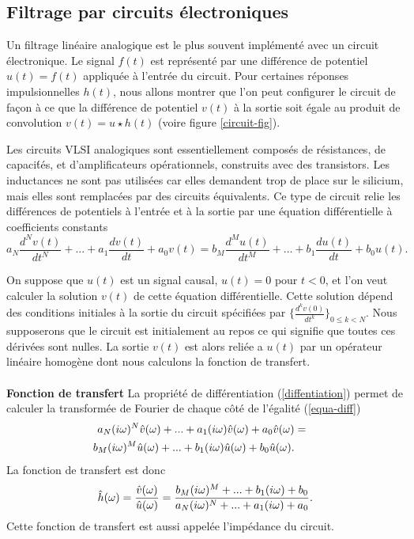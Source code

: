 \subsection{Filtrage par circuits \'electroniques}
\label{circuits}

Un filtrage lin\'eaire analogique est le plus
souvent impl\'ement\'e avec un
circuit \'electronique. Le signal $f(t)$ est
repr\'esent\'e par une diff\'erence de potentiel $u (t) = f(t)$
appliqu\'ee \`a l'entr\'ee du circuit. 
Pour certaines r\'eponses impulsionnelles $h(t)$, nous allons montrer
que l'on peut configurer le circuit de fa\c con \`a ce que
la diff\'erence de potentiel
$v (t)$ \`a la sortie soit \'egale au produit de convolution
$v (t) = u \star h (t)$ (voire figure \ref{circuit-fig}).

Les circuits VLSI analogiques sont 
essentiellement compos\'es de r\'esistances, de capaci\'t\'es, et
d'amplificateurs op\'erationnels, construits avec  
des transistors. Les inductances ne sont pas utilis\'ees 
car elles demandent trop de place sur le silicium,
mais elles sont remplac\'ees par 
des circuits \'equivalents.
Ce type de circuit relie les diff\'erences de
potentiels \`a l'entr\'ee et \`a la sortie par une \'equation 
diff\'erentielle
\`a coefficients constants
\begin{equation}
\label{equa-diff}
a_N \frac {d^N v (t)}{dt^N} + 
... + a_{1} \frac {d v (t)}{dt} + a_0 v (t) = 
b_M \frac {d^M u (t)}{dt^M} + 
... + b_{1} \frac {d u (t)}{dt} + b_0 u (t) .
\end{equation}

On suppose que $u (t)$ est un signal causal, $u (t) = 0$ pour
$t < 0$, et l'on veut calculer la solution $v (t)$ de 
cette \'equation diff\'erentielle. 
Cette solution d\'epend des conditions initiales
\`a la sortie du circuit sp\'ecifi\'ees par 
$ \{ \frac {d^k v (0)} {dt^k} \}_{0 \leq k < N}$.
Nous supposerons que le circuit est initialement au repos ce qui
signifie que toutes ces d\'eriv\'ees sont nulles. 
La sortie $v(t)$ est alors reli\'ee a $u(t)$ par un op\'erateur
lin\'eaire homog\`ene dont nous calculons la fonction de transfert.
\\
\\
{\bf Fonction de transfert}
La propri\'et\'e de diff\'erentiation 
(\ref{diffentiation}) permet de calculer
la transform\'ee de Fourier de chaque c\^ot\'e de 
l'\'egalit\'e (\ref{equa-diff})
\begin{eqnarray*}
{a_N (i{\omega})^N \hat v ({\omega}) + ... + a_{1} (i {\omega}) \hat v ({\omega}) 
+ a_0} \hat v ({\omega}) & = &\\
{b_M (i{\omega})^M \hat u ({\omega}) + ... + b_{1} (i {\omega}) \hat u ({\omega})
+ b_0} \hat u ({\omega}). & &
\end{eqnarray*}
La fonction de transfert est donc
\begin{equation}
\label{electr-transf}
\hat h ({\omega}) = \frac {\hat v ({\omega})}{\hat u ({\omega})} =
\frac {b_M (i{\omega})^M + ... + b_{1} (i {\omega}) + b_0} 
{a_N (i{\omega})^N + ... + a_{1} (i {\omega}) + a_0} .
\end{equation}
Cette fonction de transfert est aussi appel\'ee
l'imp\'edance du circuit. 

